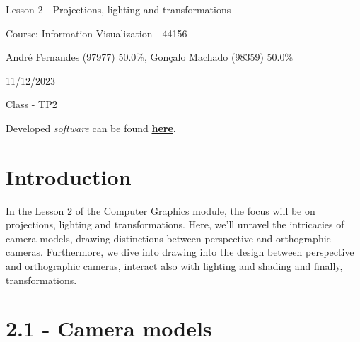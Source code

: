 \documentclass[12pt]{article}
\begin{document}
\begin{titlepage}
   \begin{center}
        \vspace*{5cm}

        \Huge{Lesson 2 - Projections, lighting and transformations}

        \vspace{0.5cm}
        \LARGE{} %
            
        \vspace{3 cm}
        \Large{Course: Information Visualization - 44156}
       
        \vspace{0.25cm}
        \large{André Fernandes (97977) 50.0\%, Gonçalo Machado (98359) 50.0\%}
       
        \vspace{3 cm}
        \Large{11/12/2023}
        
        \vspace{0.25 cm}
        \Large{Class - TP2}
        
        \vspace{5cm}
        \Large{Developed \emph{software} can be found \textbf{\href{https://github.com/goncalo-machado/VI}{here}}.}
       

       \vfill
    \end{center}
\end{titlepage}

\setcounter{page}{2}
\pagestyle{fancy}
\fancyhf{}
\rhead{\thepage}

\section*{Introduction}
\label{intro}

In the Lesson 2 of the Computer Graphics module, the focus will be on projections, lighting and transformations. Here, we'll unravel the intricacies of camera models, drawing distinctions between perspective and orthographic cameras. Furthermore, we dive into drawing into the design between perspective and orthographic cameras, interact also with lighting and shading and finally, transformations.

\section*{2.1 - Camera models}
\label{ex_21}
\end{document}
